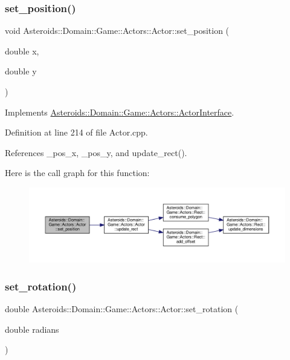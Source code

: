 \subsubsection{\texorpdfstring{set\+\_\+position()}{set\_position()}}
{\footnotesize\ttfamily void Asteroids\+::\+Domain\+::\+Game\+::\+Actors\+::\+Actor\+::set\+\_\+position (\begin{DoxyParamCaption}\item[{double}]{x,  }\item[{double}]{y }\end{DoxyParamCaption})\hspace{0.3cm}{\ttfamily [virtual]}}



Implements \hyperlink{classAsteroids_1_1Domain_1_1Game_1_1Actors_1_1ActorInterface_a7b1c2b10db2671640979619ca904474a}{Asteroids\+::\+Domain\+::\+Game\+::\+Actors\+::\+Actor\+Interface}.



Definition at line 214 of file Actor.\+cpp.



References \+\_\+pos\+\_\+x, \+\_\+pos\+\_\+y, and update\+\_\+rect().

Here is the call graph for this function\+:\nopagebreak
\begin{figure}[H]
\begin{center}
\leavevmode
\includegraphics[width=350pt]{classAsteroids_1_1Domain_1_1Game_1_1Actors_1_1Actor_aa572cc87c0d07330348c811d778aa314_cgraph}
\end{center}
\end{figure}
\mbox{\label{classAsteroids_1_1Domain_1_1Game_1_1Actors_1_1Actor_ad2687b72e2b05bebd6eb419f48d8ebba}} 
\subsubsection{\texorpdfstring{set\+\_\+rotation()}{set\_rotation()}}
{\footnotesize\ttfamily double Asteroids\+::\+Domain\+::\+Game\+::\+Actors\+::\+Actor\+::set\+\_\+rotation (\begin{DoxyParamCaption}\item[{double}]{radians }\end{DoxyParamCaption})}



